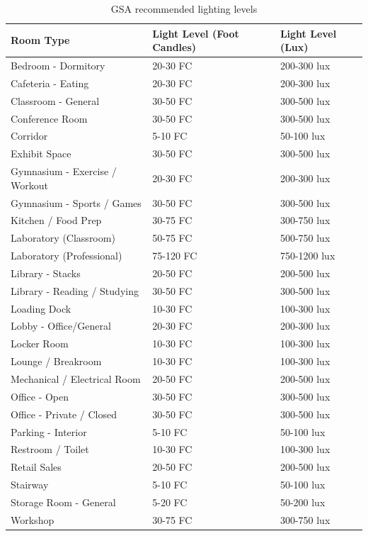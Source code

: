 \begin{table}
\centering
\caption{GSA recommended lighting levels \label{table:lighting-level-chart}} \tabularnewline
\begin{tabular}{ |p{2in}|p{1in}|p{1in}|  }
\hline
    \textbf{Room Type} & \textbf{Light Level (Foot Candles)} & \textbf{Light Level (Lux)} \\ \hline 
        Bedroom - Dormitory & 20-30 FC & 200-300 lux  \\ \hline
        Cafeteria - Eating & 20-30 FC & 200-300 lux  \\ \hline
        Classroom - General & 30-50 FC & 300-500 lux  \\ \hline
        Conference Room & 30-50 FC & 300-500 lux  \\ \hline
        Corridor & 5-10 FC & 50-100 lux  \\ \hline
        Exhibit Space & 30-50 FC & 300-500 lux  \\ \hline
        Gymnasium - Exercise / Workout & 20-30 FC & 200-300 lux  \\ \hline
        Gymnasium - Sports / Games & 30-50 FC & 300-500 lux  \\ \hline
        Kitchen / Food Prep & 30-75 FC & 300-750 lux  \\ \hline
        Laboratory (Classroom) & 50-75 FC & 500-750 lux  \\ \hline
        Laboratory (Professional) & 75-120 FC & 750-1200 lux  \\ \hline
        Library - Stacks & 20-50 FC & 200-500 lux  \\ \hline
        Library - Reading / Studying & 30-50 FC & 300-500 lux  \\ \hline
        Loading Dock & 10-30 FC & 100-300 lux  \\ \hline
        Lobby - Office/General & 20-30 FC & 200-300 lux  \\ \hline
        Locker Room  & 10-30 FC & 100-300 lux  \\ \hline
        Lounge / Breakroom & 10-30 FC & 100-300 lux  \\ \hline
        Mechanical / Electrical Room & 20-50 FC & 200-500 lux  \\ \hline
        Office - Open  & 30-50 FC & 300-500 lux  \\ \hline
        Office - Private / Closed & 30-50 FC & 300-500 lux  \\ \hline
        Parking - Interior & 5-10 FC & 50-100 lux  \\ \hline
        Restroom / Toilet & 10-30 FC & 100-300 lux  \\ \hline
        Retail Sales & 20-50 FC & 200-500 lux  \\ \hline
        Stairway & 5-10 FC & 50-100 lux  \\ \hline
        Storage Room - General & 5-20 FC & 50-200 lux  \\ \hline
        Workshop & 30-75 FC & 300-750 lux  \\ \hline
\end{tabular}
\end{table}

